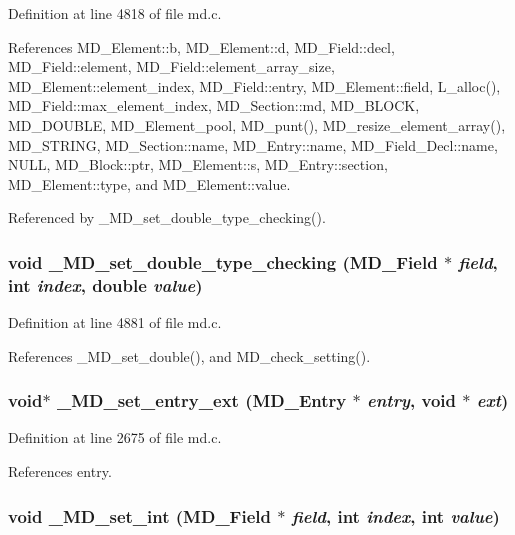 Definition at line 4818 of file md.c.

References MD\_\-Element::b, MD\_\-Element::d, MD\_\-Field::decl, MD\_\-Field::element, MD\_\-Field::element\_\-array\_\-size, MD\_\-Element::element\_\-index, MD\_\-Field::entry, MD\_\-Element::field, L\_\-alloc(), MD\_\-Field::max\_\-element\_\-index, MD\_\-Section::md, MD\_\-BLOCK, MD\_\-DOUBLE, MD\_\-Element\_\-pool, MD\_\-punt(), MD\_\-resize\_\-element\_\-array(), MD\_\-STRING, MD\_\-Section::name, MD\_\-Entry::name, MD\_\-Field\_\-Decl::name, NULL, MD\_\-Block::ptr, MD\_\-Element::s, MD\_\-Entry::section, MD\_\-Element::type, and MD\_\-Element::value.

Referenced by \_\-MD\_\-set\_\-double\_\-type\_\-checking().
\subsubsection{\setlength{\rightskip}{0pt plus 5cm}void \_\-MD\_\-set\_\-double\_\-type\_\-checking (\bf{MD\_\-Field} $\ast$ {\em field}, int {\em index}, double {\em value})}\label{md_8c_52b524532a8c1924943ca7e6108e35bc}




Definition at line 4881 of file md.c.

References \_\-MD\_\-set\_\-double(), and MD\_\-check\_\-setting().
\subsubsection{\setlength{\rightskip}{0pt plus 5cm}void$\ast$ \_\-MD\_\-set\_\-entry\_\-ext (\bf{MD\_\-Entry} $\ast$ {\em entry}, void $\ast$ {\em ext})}\label{md_8c_2aa83a9864c4b791e5724a9d343f3e1d}




Definition at line 2675 of file md.c.

References entry.
\subsubsection{\setlength{\rightskip}{0pt plus 5cm}void \_\-MD\_\-set\_\-int (\bf{MD\_\-Field} $\ast$ {\em field}, int {\em index}, int {\em value})}\label{md_8c_78638c962f83ab4e8c35c2aa92d23a1f}




